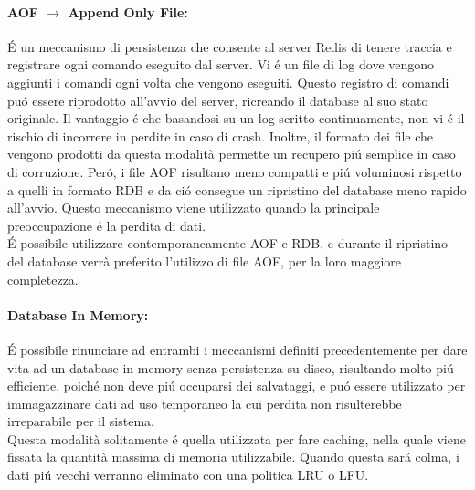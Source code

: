 \begin{itemize}
    \paragraph{AOF $\to$ Append Only File:}
    É un meccanismo di persistenza che consente al server Redis di tenere traccia e registrare ogni comando eseguito dal server.
    Vi é un file di log dove vengono aggiunti i comandi ogni volta che vengono eseguiti.
    Questo registro di comandi puó essere riprodotto all'avvio del server, ricreando il database al suo stato originale.
    Il vantaggio é che basandosi su un log scritto continuamente, non vi é il rischio di incorrere in perdite in caso di crash. Inoltre,
    il formato dei file che vengono prodotti da questa modalità permette un recupero piú semplice in caso di corruzione.
    Peró, i file AOF risultano meno compatti e piú voluminosi rispetto a quelli in formato RDB e da ció consegue un ripristino del database
    meno rapido all'avvio. Questo meccanismo viene utilizzato quando la principale preoccupazione é la perdita di dati.\\

    É possibile utilizzare contemporaneamente AOF e RDB, e durante il ripristino del database verrà preferito l'utilizzo di file AOF, per la loro
    maggiore completezza.


    \paragraph{Database In Memory:}
    É possibile rinunciare ad entrambi i meccanismi definiti precedentemente per dare vita ad un database in memory senza persistenza su disco, risultando molto piú
    efficiente, poiché non deve piú occuparsi dei salvataggi, e puó essere utilizzato per immagazzinare dati ad uso temporaneo la cui
    perdita non risulterebbe irreparabile per il sistema.\\
    Questa modalità solitamente é quella utilizzata per fare caching, nella quale viene fissata la quantità massima di memoria utilizzabile. Quando questa sará
    colma, i dati piú vecchi verranno eliminato con una politica LRU o LFU.
\end{itemize}

